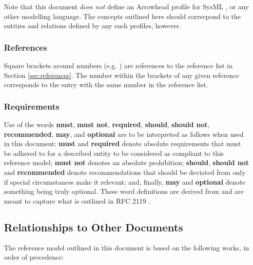 Note that this document does \textit{not} define an Arrowhead profile for SysML \cite{omg2019sysml}, or any other modelling language.
The concepts outlined here should corrsepond to the entities and relations defined by any such profiles, however.

\subsubsection{References}

Square brackets around numbers (e.g. \cite{delsing2017iot}) are references to the reference list in Section \ref{sec:references}.
The number within the brackets of any given reference corresponds to the entry with the same number in the reference list.

\subsubsection{Requirements}

Use of the words \textbf{must}, \textbf{must not}, \textbf{required}, \textbf{should}, \textbf{should not}, \textbf{recommended}, \textbf{may}, and \textbf{optional} are to be interpreted as follows when used in this document: \textbf{must} and \textbf{required} denote absolute requirements that must be adhered to for a described entity to be considered as compliant to this reference model; \textbf{must not} denotes an absolute prohibition; \textbf{should}, \textbf{should not} and \textbf{recommended} denote recommendations that should be deviated from only if special circumstances make it relevant; and, finally, \textbf{may} and \textbf{optional} denote something being truly optional.
These word definitions are derived from and are meant to capture what is outlined in RFC 2119 \cite{bradner1997keywords}.

\subsection{Relationships to Other Documents}
\label{sec:introduction:relationships}

The reference model outlined in this document is based on the following works, in order of precedence:

